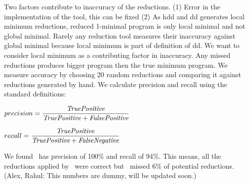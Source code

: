 Two factors contribute to inaccuracy of the reductions. (1) Error in the implementation of the tool, this can be fixed (2) As hdd and dd generates local minimum reductions, reduced 1-minimal program is only local minimal and not global minimal. Rarely any reduction tool measures their inaccuracy  against global minimal because local minimum is part of definition of dd. We want to consider local minimum as a contributing factor in inaccuracy. Any missed reductions produces bigger program then the true minimum program. We measure accuracy by choosing 20 random reductions and comparing it against reductions generated by hand. We calculate precision and recall using the standard definitions:

$precision =  \dfrac{\emph{TruePositive}}{ \emph{TruePositive} + \emph{FalsePositive}}$ 

$recall =  \dfrac{\emph{TruePositive}}{ \emph{TruePositive} + \emph{FalseNegative}}$ 

We found \mytool\ has precision of 100\% and recall of 94\%. This means, all the reductions applied by \mytool\ were correct but \mytool\ missed 6\% of potential reductions. (Alex, Rahul: This numbers are dummy, will be updated soon.)
